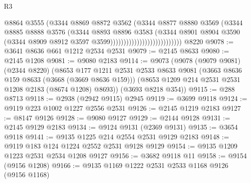 \begin{lexlean}{R3}
\begin{coremodule}
                                              @8864
                                              @3555
                                              (@3344
                                                @8869
                                                @8872
                                                @3562
                                                (@3344
                                                  @8877
                                                  @8880
                                                  @3569
                                                  (@3344
                                                    @8885
                                                    @8888
                                                    @3576
                                                    (@3344
                                                      @8893
                                                      @8896
                                                      @3583
                                                      (@3344
                                                        @8901
                                                        @8904
                                                        @3590
                                                        (@3344
                                                          @8909
                                                          @8912
                                                          @3597
                                                          @3599)))))))))))))))))))))))))))
    @8220
@9078 := @3641 @8636 @661 @1212 @2534 @2531
@9079 := @2145 @8633
@9080 := @2145 @1208
@9081 := @9080 @2183
@9114 := @9073
    (@9078
      (@9079 @9081)
      (@2344 @8220)
      (@8653
        @177
        @1211
        @2531
        @2533
        @8633
        @9081
        (@3663 @8636 @159 @8633 (@3668 (@3669 @8636 @159)))
        (@8653 @1209 @214 @2531 @2531 @1208 @2183 (@8674 @1208) @8693))
      (@3693 @8218 @354))
@9115 := @288 @8713
@9118 := @2938 (@2942 @9115) @2945
@9119 := @3699 @9118
@9124 := @9119 @223 @1002 @1227 @2556 @2531
@9126 := @2145 @1219 @2183
@9127 := @8147 @9126
@9128 := @9080 @9127
@9129 := @2144 @9128
@9131 := @2145 @9129 @2183
@9134 := @9124 @9131 (@2369 @9131)
@9135 := @3654 @9118
@9141 := @9135 @1225 @214 @2554 @2531 @9129 @2183
@9148 := @9119 @183 @124 @1224 @2552 @2531 @9128 @9129
@9154 := @9135 @1209 @1223 @2531 @2534 @1208 @9127
@9156 := @3682 @9118 @11
@9158 := @9154 (@9156 @1208)
@9166 := @9135 @1169 @1222 @2531 @2533 @1168 @9126 (@9156 @1168)

\end{coremodule}
\end{lexlean}
